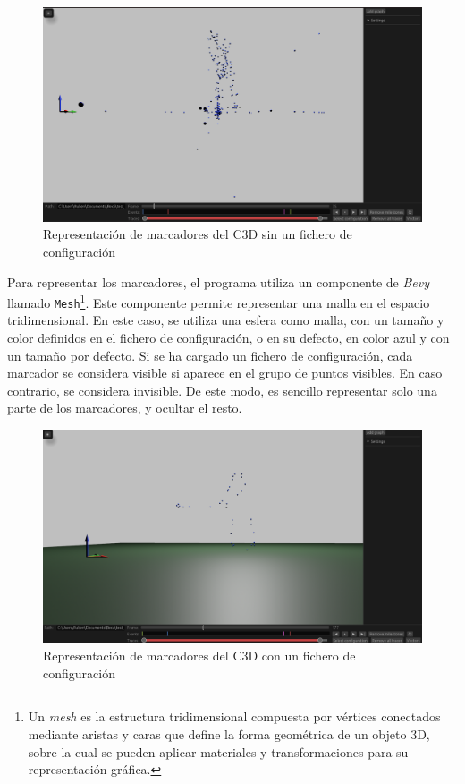 \begin{figure}[H]
  \centering
  \includegraphics[width=\textwidth]{imagenes/marcadores.png}
  \caption{Representación de marcadores del \acs{C3D} sin un fichero de configuración}
  \label{fig:marcadores}
\end{figure}

Para representar los marcadores, el programa utiliza un componente de \textit{Bevy} llamado \texttt{Mesh}\footnote{Un \textit{mesh} es la estructura tridimensional compuesta por vértices conectados mediante aristas y caras que define la forma geométrica de un objeto 3D, sobre la cual se pueden aplicar materiales y transformaciones para su representación gráfica.}. Este componente permite representar una malla en el espacio tridimensional. En este caso, se utiliza una esfera como malla, con un tamaño y color definidos en el fichero de configuración, o en su defecto, en color azul y con un tamaño por defecto. Si se ha cargado un fichero de configuración, cada marcador se considera visible si aparece en el grupo de puntos visibles. En caso contrario, se considera invisible. De este modo, es sencillo representar solo una parte de los marcadores, y ocultar el resto.

\begin{figure}[H]
  \centering
  \includegraphics[width=\textwidth]{imagenes/config-basica.png}
  \caption{Representación de marcadores del \acs{C3D} con un fichero de configuración}
  \label{fig:cfg-basica}
\end{figure}

